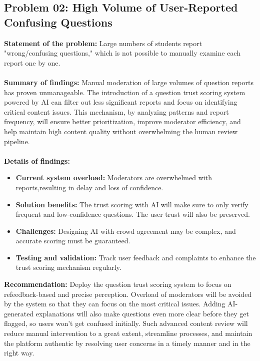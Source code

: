 \documentclass[12pt,a4paper,oneside]{book}
\begin{document}
\subsection{Problem 02: High Volume of User-Reported Confusing Questions}
\textbf{Statement of the problem:} Large numbers of students report "wrong/confusing questions," which is not possible to manually examine each report one by one.\\ \\
\textbf{Summary of findings:} Manual moderation of large volumes of question reports has proven unmanageable. The introduction of a question trust scoring system powered by AI can filter out less significant reports and focus on identifying critical content issues. This mechanism, by analyzing patterns and report frequency, will ensure better prioritization, improve moderator efficiency, and help maintain high content quality without overwhelming the human review pipeline.\\ \\
\textbf{Details of findings:}
\begin{itemize}
    \item \textbf{Current system overload:} Moderators are overwhelmed with reports,resulting in delay and loss of confidence.
    \item \textbf{Solution benefits:} The trust scoring with AI will make sure to only verify frequent and low-confidence questions. The user trust will also be preserved.
    \item \textbf{Challenges:} Designing AI with crowd agreement may be complex, and accurate scoring must be guaranteed.
    \item \textbf{Testing and validation:} Track user feedback and complaints to enhance the trust scoring mechanism regularly.

\end{itemize}
\textbf{Recommendation:} Deploy the question trust scoring system to focus on refeedback-based and precise perception. Overload of moderators will be avoided by the system so that they can focus on the most critical issues. Adding AI-generated explanations will also make questions even more clear before they get flagged, so users won't get confused initially. Such advanced content review will reduce manual intervention to a great extent, streamline processes, and maintain the platform authentic by resolving user concerns in a timely manner and in the right way.
\end{document}
